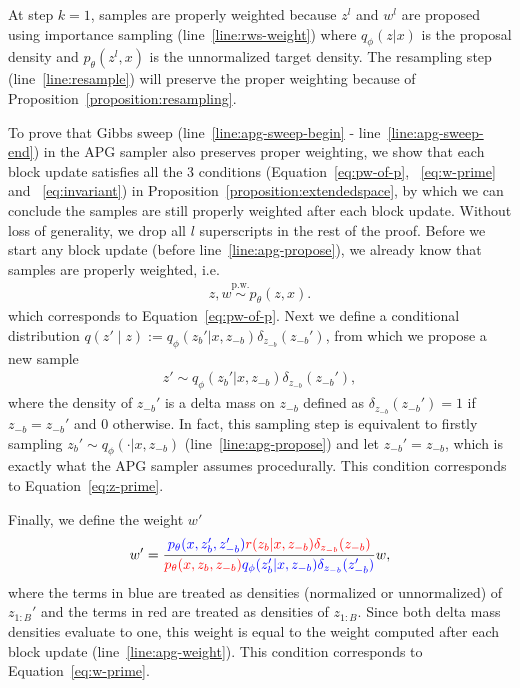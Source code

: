 \documentclass{article}
\theoremstyle{definition}
\newcommand{\given}{\lvert}
\newcommand{\pw}{\overset{\text{p.w.}}{\sim}
}
\begin{document}
At step $k=1$, samples are properly weighted because $z^l$ and $w^l$ are proposed using importance sampling (line~\ref{line:rws-weight}) where $q_\phi(z \given x)$ is the proposal density and $p_\theta(z^l, x)$ is the unnormalized target density. The resampling step (line~\ref{line:resample}) will preserve the proper weighting because of  Proposition~\ref{proposition:resampling}.

To prove that Gibbs sweep (line~\ref{line:apg-sweep-begin} - line~\ref{line:apg-sweep-end}) in the APG sampler also preserves proper weighting, we show that each block update satisfies all the 3 conditions (Equation~\ref{eq:pw-of-p}, ~\ref{eq:w-prime} and ~\ref{eq:invariant}) in Proposition~\ref{proposition:extendedspace}, by which we can conclude the samples are still properly weighted after each block update. Without loss of generality, we drop all $l$ superscripts in the rest of the proof. Before we start any block update (before line~\ref{line:apg-propose}),  we already know that samples are properly weighted, i.e.
\begin{align}
    z, w \pw p_\theta(z, x).
\end{align}
which corresponds to Equation~\ref{eq:pw-of-p}. Next we define a conditional distribution $q(z' \mid z):= q_\phi(z_b' \given x, z_{-b}) \delta_{z_{-b}}(z_{-b}')$, from which we propose a new sample
\begin{align}
    z' \sim q_\phi(z_b' \given x, z_{-b}) \delta_{z_{-b}}(z_{-b}'),
\end{align}
where the density of $z_{-b}'$ is a delta mass on $z_{-b}$ defined as $\delta_{z_{-b}}(z_{-b}') = 1$ if $z_{-b} = z_{-b}'$ and $0$ otherwise.
In fact, this sampling step is equivalent to firstly sampling $z_b' \sim q_\phi(\cdot \given x, z_{-b})$ (line~\ref{line:apg-propose}) and let $z_{-b}' = z_{-b}$, which is exactly what the APG sampler assumes procedurally. This condition corresponds to Equation~\ref{eq:z-prime}.

Finally, we define the weight $w'$
\begin{align}
    w' = \frac{{\color{blue}p_\theta(x, z_b', z_{-b}')} {\color{red}r(z_b \given x, z_{-b}) \delta_{z_{-b}}(z_{-b})}}{{\color{red}p_\theta(x, z_b, z_{-b})} {\color{blue}q_\phi(z_b' \given x, z_{-b}) \delta_{z_{-b}}(z_{-b}')}} w,
\end{align}
where the terms in blue are treated as densities (normalized or unnormalized) of $z_{1:B}'$ and the terms in red are treated as densities of $z_{1:B}$.
Since both delta mass densities evaluate to one, this weight is equal to the weight computed after each block update (line~\ref{line:apg-weight}). This condition corresponds to Equation~\ref{eq:w-prime}.
\end{document}
